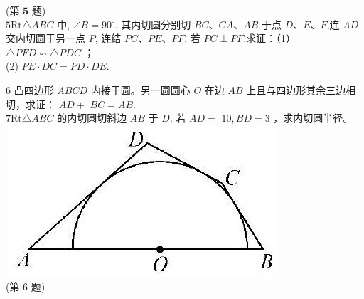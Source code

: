 \documentclass[10pt]{article}
\begin{document}
(第 $\mathbf{5}$ 题)\\
$5 \mathrm{Rt} \triangle A B C$ 中, $\angle B=90^{\circ}$. 其内切圆分别切 $B C 、 C A 、 A B$ 于点 $D 、 E 、 F$,连 $A D$ 交内切圆于另一点 $P$, 连结 $P C 、 P E 、 P F$, 若 $P C \perp P F$.求证：（1） $\triangle P F D \backsim \triangle P D C$ ；\\
(2) $P E \cdot D C=P D \cdot D E$.

6 凸四边形 $A B C D$ 内接于圆。另一圆圆心 $O$ 在边 $A B$ 上且与四边形其余三边相切，求证： $A D+$ $B C=A B$.\\
$7 \mathrm{Rt} \triangle A B C$ 的内切圆切斜边 $A B$ 于 $D$. 若 $A D=$ $10, B D=3$ ，求内切圆半径。\\
\includegraphics[max width=\textwidth, center]{2024_10_30_66b8e5e701da2093c133g-042}\\
(第 6 题)
\end{document}
